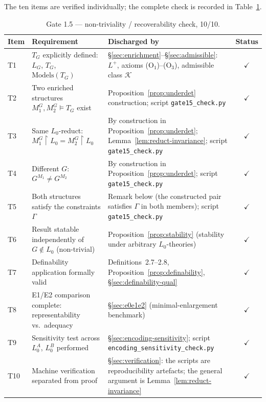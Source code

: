 \documentclass[11pt]{article}
\theoremstyle{plain}
\theoremstyle{definition}
\theoremstyle{remark}
\begin{document}
The ten items are verified individually; the complete check is
recorded in Table~\ref{tab:gate15}.

\begin{table}[ht]
\centering
\begin{tabular}{@{}lp{3.6cm}p{5.6cm}c@{}}
\toprule
\textbf{Item} & \textbf{Requirement} & \textbf{Discharged by} & \textbf{Status}\\
\midrule
T1 & $T_G$ explicitly defined: $L_G$, $T_G$, $\mathrm{Models}(T_G)$
& \S\ref{sec:enrichment}--\S\ref{sec:admissible}: $L^+$, axioms
(O$_1$)--(O$_3$), admissible class $\mathcal K$
& $\checkmark$\\
T2 & Two enriched structures $M_1^G, M_2^G \models T_G$ exist
& Proposition~\ref{prop:underdet} construction; script
\texttt{gate15\_check.py}
& $\checkmark$\\
T3 & Same $L_0$-reduct: $M_1^G\!\upharpoonright L_0 = M_2^G\!\upharpoonright L_0$
& By construction in Proposition~\ref{prop:underdet};
Lemma~\ref{lem:reduct-invariance}; script \texttt{gate15\_check.py}
& $\checkmark$\\
T4 & Different $G$: $G^{M_1} \neq G^{M_2}$
& By construction in Proposition~\ref{prop:underdet}; script
\texttt{gate15\_check.py}
& $\checkmark$\\
T5 & Both structures satisfy the constraints $\Gamma$
& Remark below (the constructed pair satisfies
$\Gamma$ in both members); script \texttt{gate15\_check.py}
& $\checkmark$\\
T6 & Result statable independently of $G \notin L_0$ (non-trivial)
& Proposition~\ref{prop:stability} (stability under arbitrary
$L_0$-theories)
& $\checkmark$\\
T7 & Definability application formally valid
& Definitions~2.7--2.8, Proposition~\ref{prop:definability},
\S\ref{sec:definability-qual}
& $\checkmark$\\
T8 & E1/E2 comparison complete: representability vs.\ adequacy
& \S\ref{sec:e0e1e2} (minimal-enlargement benchmark)
& $\checkmark$\\
T9 & Sensitivity test across $L_0^A$, $L_0^B$ performed
& \S\ref{sec:encoding-sensitivity}; script
\texttt{encoding\_sensitivity\_check.py}
& $\checkmark$\\
T10 & Machine verification separated from proof
& \S\ref{sec:verification}: the scripts are reproducibility
artefacts; the general argument is
Lemma~\ref{lem:reduct-invariance}
& $\checkmark$\\
\bottomrule
\end{tabular}
\caption{Gate 1.5 --- non-triviality / recoverability check, 10/10.}
\label{tab:gate15}
\end{table}
\end{document}
